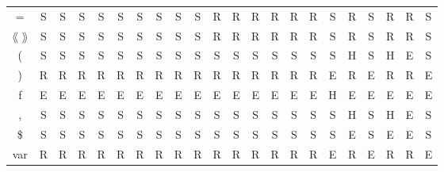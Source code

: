 \begin{table}[h]
\begin{tabular}{c|ccccccccccccccccccccc}
=               & S  &  S  & S & S &  S  & S & S & S  &  S  &   R     &    R    & R  & R  & R & R  & S & R & S & R & R  & S   \\ %
$\lang$ $\rang$ & S  &  S  & S & S &  S  & S & S & S  &  S  &   R     &    R    & R  & R  & R & R  & S & R & S & R & R  & S   \\ %
(               & S  &  S  & S & S &  S  & S & S & S  &  S  &   S     &    S    & S  & S  & S & S  & S & H & S & H & E  & S   \\ %
)               & R  &  R  & R & R &  R  & R & R & R  &  R  &   R     &    R    & R  & R  & R & R  & E & R & E & R & R  & E   \\ %
f               & E  &  E  & E & E &  E  & E & E & E  &  E  &   E     &    E    & E  & E  & E & E  & H & E & E & E & E  & E   \\ %
,               & S  &  S  & S & S &  S  & S & S & S  &  S  &   S     &    S    & S  & S  & S & S  & S & H & S & H & E  & S   \\ %
\$              & S  &  S  & S & S &  S  & S & S & S  &  S  &   S     &    S    & S  & S  & S & S  & S & E & S & E & E  & S   \\ %
var             & R  &  R  & R & R &  R  & R & R & R  &  R  &   R     &    R    & R  & R  & R & R  & E & R & E & R & R  & E      %
\end{tabular}
\end{table}

